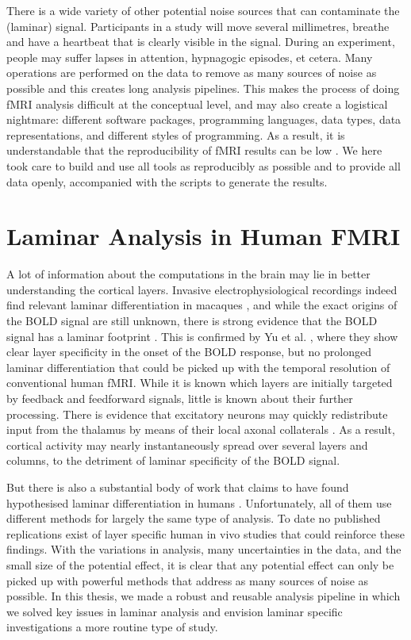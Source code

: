 There is a wide variety of other potential noise sources that can contaminate the (laminar) signal. Participants in a study will move several millimetres, breathe and have a heartbeat that is clearly visible in the signal. During an experiment, people may suffer lapses in attention, hypnagogic episodes, et cetera. Many operations are performed on the data to remove as many sources of noise as possible and this creates long analysis pipelines. This makes the process of doing fMRI analysis difficult at the conceptual level, and may also create a logistical nightmare: different software packages, programming languages, data types, data representations, and different styles of programming. As a result, it is understandable that the reproducibility of fMRI results can be low \cite{Nosek2015,Gorgolewski2016a}. We here took care to build and use all tools as reproducibly as possible and to provide all data openly, accompanied with the scripts to generate the results.

\section{Laminar Analysis in Human FMRI}
A lot of information about the computations in the brain may lie in better understanding the cortical layers. Invasive electrophysiological recordings indeed find relevant laminar differentiation in macaques \cite{Buffalo2011,Maier2010,Maier2011,VanKerkoerle2017}, and while the exact origins of the BOLD signal are still unknown, there is strong evidence that the BOLD signal has a laminar footprint \cite{Goense2006}. This is confirmed by Yu et al. \cite{Yu2014}, where they show clear layer specificity in the onset of the BOLD response, but no prolonged laminar differentiation that could be picked up with the temporal resolution of conventional human fMRI. While it is known which layers are initially targeted by feedback and feedforward signals, little is known about their further processing. There is evidence that excitatory neurons may quickly redistribute input from the thalamus by means of their local axonal collaterals \cite{Guy2017,ReyesPuerta2015}. As a result, cortical activity may nearly instantaneously spread over several layers and columns, to the detriment of laminar specificity of the BOLD signal.

But there is also a substantial body of work that claims to have found hypothesised laminar differentiation in humans \cite{Maass2014,Muckli2015,Scheeringa2016,Kok2016,Huber2017}. Unfortunately, all of them use different methods for largely the same type of analysis. To date no published replications exist of layer specific human in vivo studies that could reinforce these findings. With the variations in analysis, many uncertainties in the data, and the small size of the potential effect, it is clear that any potential effect can only be picked up with powerful methods that address as many sources of noise as possible. In this thesis, we made a robust and reusable analysis pipeline in which we solved key issues in laminar analysis and envision laminar specific investigations a more routine type of study.
